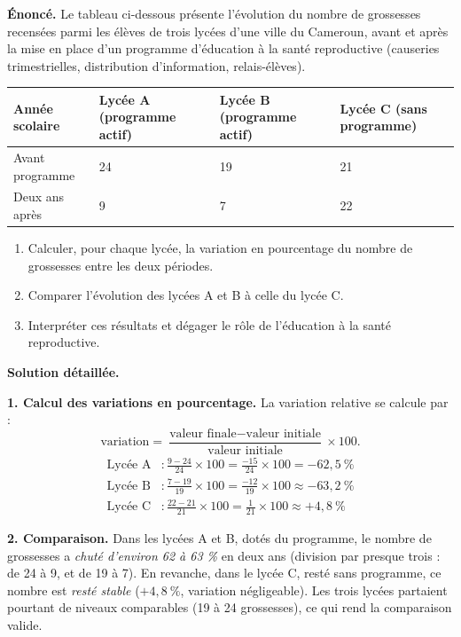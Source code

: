 \documentclass[11pt]{article}
\begin{document}
\begin{exoresolu}
\textbf{Énoncé.} Le tableau ci-dessous présente l'évolution du nombre de grossesses recensées parmi les élèves de trois lycées d'une ville du Cameroun, avant et après la mise en place d'un programme d'éducation à la santé reproductive (causeries trimestrielles, distribution d'information, relais-élèves).

\begin{center}
\begin{tabularx}{\linewidth}{|l|X|X|X|}\hline
\rowcolor{popblueL} Année scolaire & Lycée A (programme actif) & Lycée B (programme actif) & Lycée C (sans programme) \\ \hline
Avant programme & 24 & 19 & 21 \\ \hline
Deux ans après & 9 & 7 & 22 \\ \hline
\end{tabularx}
\end{center}

\begin{enumerate}
\item Calculer, pour chaque lycée, la variation en pourcentage du nombre de grossesses entre les deux périodes.
\item Comparer l'évolution des lycées A et B à celle du lycée C.
\item Interpréter ces résultats et dégager le rôle de l'éducation à la santé reproductive.
\end{enumerate}
\tcblower
\textbf{Solution détaillée.}

\textbf{1. Calcul des variations en pourcentage.} La variation relative se calcule par :
\[
\text{variation} = \frac{\text{valeur finale} - \text{valeur initiale}}{\text{valeur initiale}} \times 100.
\]
\begin{align*}
\text{Lycée A} &: \frac{9 - 24}{24} \times 100 = \frac{-15}{24} \times 100 = -62{,}5\ \% \\
\text{Lycée B} &: \frac{7 - 19}{19} \times 100 = \frac{-12}{19} \times 100 \approx -63{,}2\ \% \\
\text{Lycée C} &: \frac{22 - 21}{21} \times 100 = \frac{1}{21} \times 100 \approx +4{,}8\ \%
\end{align*}

\textbf{2. Comparaison.} Dans les lycées A et B, dotés du programme, le nombre de grossesses a \emph{chuté d'environ 62 à 63 \%} en deux ans (division par presque trois : de 24 à 9, et de 19 à 7). En revanche, dans le lycée C, resté sans programme, ce nombre est \emph{resté stable} ($+4{,}8\ \%$, variation négligeable). Les trois lycées partaient pourtant de niveaux comparables (19 à 24 grossesses), ce qui rend la comparaison valide.


\end{exoresolu}
\end{document}
